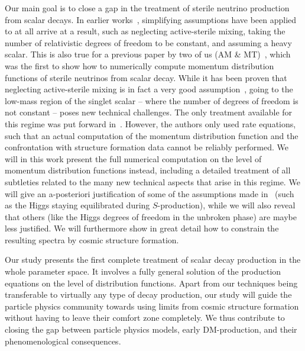 Our main goal is to close a gap in the treatment of sterile neutrino production from scalar decays. In earlier works~\cite{Kusenko:2006rh,Petraki:2007gq,Merle:2013wta,Merle:2015oja}, simplifying assumptions have been applied to at all arrive at a result, such as neglecting active-sterile mixing, taking the number of relativistic degrees of freedom to be constant, and assuming a heavy scalar. This is also true for a previous paper by two of us (AM \& MT)~\cite{Merle:2015oja}, which was the first to show how to numerically compute momentum distribution functions of sterile neutrinos from scalar decay. While it has been proven that neglecting active-sterile mixing is in fact a very good assumption~\cite{Merle:2015vzu}, going to the low-mass region of the singlet scalar -- where the number of degrees of freedom is not constant -- poses new technical challenges. The only treatment available for this regime was put forward in~\cite{Adulpravitchai:2014xna}. However, the authors only used rate equations, such that an actual computation of the momentum distribution function and the confrontation with structure formation data cannot be reliably performed. We will in this work present the full numerical computation on the level of momentum distribution functions instead, including a detailed treatment of all subtleties related to the many new technical aspects that arise in this regime. We will give an a-posteriori justification of some of the assumptions made in~\cite{Adulpravitchai:2014xna} (such as the Higgs staying equilibrated during $S$-production), while we will also reveal that others (like the Higgs degrees of freedom in the unbroken phase) are maybe less justified. We will furthermore show in great detail how to constrain the resulting spectra by cosmic structure formation.

Our study presents the first complete treatment of scalar decay production in the whole parameter space. It involves a fully general solution of the production equations on the level of distribution functions. Apart from our techniques being transferable to virtually any type of decay production, our study will guide the particle physics community towards using limits from cosmic structure formation without having to leave their comfort zone completely. We thus contribute to closing the gap between particle physics models, early DM-production, and their phenomenological consequences.

